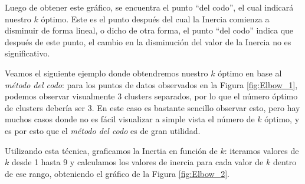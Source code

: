 \documentclass[12pt,a4paper]{article}
\begin{document}
\begin{sloppypar}
Luego de obtener este gráfico, se encuentra el punto ``del codo'', el cual indicará nuestro $k$ óptimo. Este es el punto después del cual la Inercia comienza a disminuir de forma lineal, o dicho de otra forma, el punto ``del codo'' indica que después de este punto, el cambio en la disminución del valor de la Inercia no es significativo. 

Veamos el siguiente ejemplo donde obtendremos nuestro $k$ óptimo en base al \textit{método del codo}: para los puntos de datos observados en la Figura \ref{fig:Elbow_1}, podemos observar visualmente 3 clusters separados, por lo que el número óptimo de clusters debería ser 3. En este caso es bastante sencillo observar esto, pero hay muchos casos donde no es fácil visualizar a simple vista el número de $k$ óptimo, y es por esto que el \textit{método del codo} es de gran utilidad. 

Utilizando esta técnica, graficamos la Inertia en función de $k$: iteramos valores de $k$ desde 1 hasta 9 y calculamos los valores de inercia para cada valor de $k$ dentro de ese rango, obteniendo el gráfico de la Figura \ref{fig:Elbow_2}.


\end{sloppypar}
\end{document}
